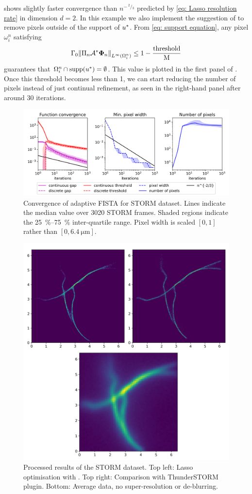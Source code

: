 \documentclass[10pt,a4paper,onecolumn]{article}
\numberwithin{equation}{section}
\newcommand{\norm}[1]{{\left\lVert #1 \right\rVert}}
\renewcommand{\sfrac}[2]{\,^{#1}\!\!/\!_{#2}}
\newcommand{\op}[1]{\operatorname{#1}}\newcommand{\overtext}[2]{\stackrel{\text{#1}}{#2}}
\renewcommand{\vec}{\mathbf}
\newcommand*{\varf}[1]{%
	\IfEqCase{#1}{%
		{0}{u}%
		{1}{v}%
		{2}{w}%
	}[u#1]%
}
\newcommand*{\vard}[1]{%
	\IfEqCase{#1}{%
		{0}{\varphi}%
		{1}{\psi}%
	}[\varphi #1]%
}
\newcommand*{\vars}[1]{%
	\IfEqCase{#1}{%
		{0}{\alpha}%
		{1}{\beta}%
		{2}{\gamma}%
		{3}{a}%
		{4}{b}%
		{5}{c}%
	}[k#1]%
}
\newcommand*{\data}[1]{%
	\IfEqCase{#1}{%
		{0}{\eta}%
		{1}{\nu}%
	}[g]%
}
\newcommand{\domain}{\omega}
\newcommand*{\vvard}[1]{\vec{\vard{#1}}}\newcommand*{\vdata}[1]{\vec{\data{#1}}}
\begin{document}
 shows slightly faster convergence than $n^{-\sfrac23}$ predicted by \eqref{eq: Lasso resolution rate} in dimension $d=2$. In this example we also implement the suggestion of  to remove pixels outside of the support of $\varf0^*$. From \eqref{eq: support equation}, any pixel $\domain_i^n$ satisfying 
\begin{equation}
	\vars2_0\norm{\Pi_n\A^*\vvard0_n}_{L^\infty(\domain_i^n)} \leq 1-\frac{\op{threshold}}{\mu}
\end{equation}
guarantees that $\domain_i^n\cap\op{supp}(\varf0^*) = \emptyset$. This value is plotted in the first panel of . Once this threshold becomes less than 1, we can start reducing the number of pixels instead of just continual refinement, as seen in the right-hand panel after around 30 iterations.

\begin{figure}[H]\centering
	\includegraphics[width=.82\textwidth]{lasso2_convergence}
	\caption{Convergence of adaptive FISTA for STORM dataset. Lines indicate the median value over 3020 STORM frames. Shaded regions indicate the \SIrange{25}{75}{\percent} inter-quartile range. Pixel width is scaled $[0,1]$ rather than $[0,\SI{6.4}{\micro\meter}]$.}\label{fig: STORM convergence}
\end{figure}
\begin{figure}\centering
	\includegraphics[width=.77\textwidth]{STORM_recon}
	\caption{Processed results of the STORM dataset. Top left: Lasso optimisation with . Top right: Comparison with ThunderSTORM plugin. Bottom: Average data, no super-resolution or de-blurring.}\label{fig: STORM results}
\end{figure}
\end{document}

